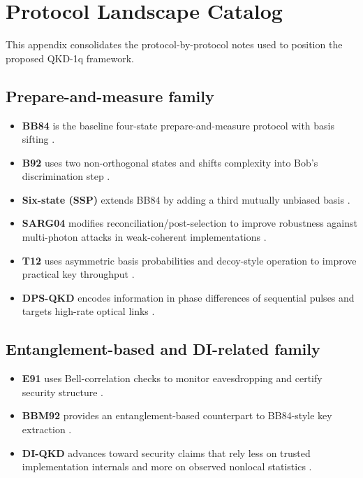 \section{Protocol Landscape Catalog}
This appendix consolidates the protocol-by-protocol notes used to position the proposed QKD-1q framework.

\subsection{Prepare-and-measure family}
\begin{itemize}
    \item \textbf{BB84} is the baseline four-state prepare-and-measure protocol with basis sifting \cite{BB84}.
    \item \textbf{B92} uses two non-orthogonal states and shifts complexity into Bob's discrimination step \cite{B92}.
    \item \textbf{Six-state (SSP)} extends BB84 by adding a third mutually unbiased basis \cite{SSP}.
    \item \textbf{SARG04} modifies reconciliation/post-selection to improve robustness against multi-photon attacks in weak-coherent implementations \cite{SARG04}.
    \item \textbf{T12} uses asymmetric basis probabilities and decoy-style operation to improve practical key throughput \cite{T12}.
    \item \textbf{DPS-QKD} encodes information in phase differences of sequential pulses and targets high-rate optical links \cite{DPS2002}.
\end{itemize}

\subsection{Entanglement-based and DI-related family}
\begin{itemize}
    \item \textbf{E91} uses Bell-correlation checks to monitor eavesdropping and certify security structure \cite{ekert1991quantum}.
    \item \textbf{BBM92} provides an entanglement-based counterpart to BB84-style key extraction \cite{B92ent}.
    \item \textbf{DI-QKD} advances toward security claims that rely less on trusted implementation internals and more on observed nonlocal statistics \cite{DIQKDReview2023}.
\end{itemize}

